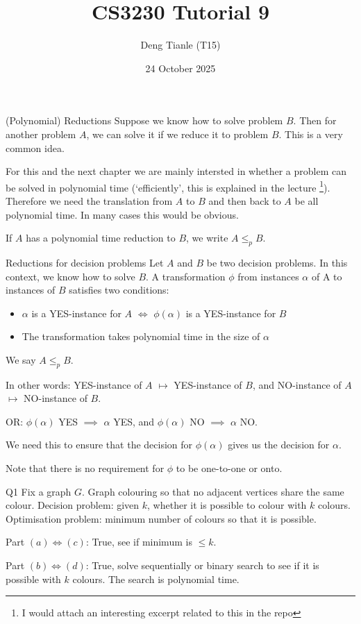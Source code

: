 \documentclass[t]{beamer}
\title{CS3230 Tutorial 9}
\author{Deng Tianle (T15)}
\date{24 October 2025}
\def\le{\leqslant}
\begin{document}
\frame{\titlepage} 

\begin{frame}{(Polynomial) Reductions}
  Suppose we know how to solve problem $B$. Then for another problem $A$, we can solve it if we reduce it to problem $B$. This is a very common idea. 
  \par For this and the next chapter we are mainly intersted in whether a problem can be solved in polynomial time (`efficiently', this is explained in the lecture \footnote{I would attach an interesting excerpt related to this in the repo}). Therefore we need the translation from $A$ to $B$ and then back to $A$ be all polynomial time. In many cases this would be obvious. 
  \par If $A$ has a polynomial time reduction to $B$, we write $A \le_p B$. 
\end{frame}
\begin{frame}{Reductions for decision problems}
  Let $A$ and $B$ be two decision problems. In this context, we know how to solve $B$. 
  A transformation $\phi$ from instances $\alpha$ of A to instances of $B$ satisfies two conditions:
  \begin{itemize}
    \item $\alpha$ is a YES-instance for $A$ $\iff$ $\phi(\alpha)$ is a YES-instance for $B$
    \item The transformation takes polynomial time in the size of $\alpha$
  \end{itemize}
  We say $A \le_p B$. 
  \par In other words: YES-instance of $A$ $\mapsto$ YES-instance of $B$, and NO-instance of $A$ $\mapsto$ NO-instance of $B$. 
  \par OR: $\phi(\alpha)$ YES $\implies$ $\alpha$ YES, and $\phi(\alpha)$ NO $\implies$ $\alpha$ NO. 
  \par We need this to ensure that the decision for $\phi(\alpha)$ gives us the decision for $\alpha$. 
  \par Note that there is no requirement for $\phi$ to be one-to-one or onto. 
\end{frame}
\begin{frame}{Q1}
  Fix a graph $G$. Graph colouring so that no adjacent vertices share the same colour. Decision problem: given $k$, whether it is possible to colour with $k$ colours. Optimisation problem: minimum number of colours so that it is possible. 
  \par Part $(a) \iff (c)$: True, see if minimum is $\le k$. 
  \par Part $(b) \iff (d)$: True, solve sequentially or binary search to see if it is possible with $k$ colours. The search is polynomial time. 
\end{frame}
\end{document}
